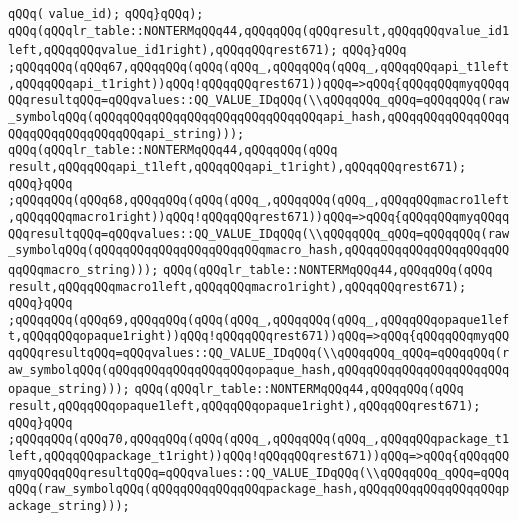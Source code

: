\verb|qQQq(|\newline
\verb|value_id);|\newline
\verb|qQQq}qQQq);|\newline
\verb|qQQq(qQQqlr_table::NONTERMqQQq44,qQQqqQQq(qQQqresult,qQQqqQQqvalue_id1left,qQQqqQQqvalue_id1right),qQQqqQQqrest671);|\newline
\verb|qQQq}qQQq|\newline
\verb|;qQQqqQQq(qQQq67,qQQqqQQq(qQQq(qQQq_,qQQqqQQq(qQQq_,qQQqqQQqapi_t1left,qQQqqQQqapi_t1right))qQQq!qQQqqQQqrest671))qQQq=>qQQq{qQQqqQQqmyqQQqqQQqresultqQQq=qQQqvalues::QQ_VALUE_IDqQQq(\\qQQqqQQq_qQQq=qQQqqQQq(raw_symbolqQQq(qQQqqQQqqQQqqQQqqQQqqQQqqQQqqQQqapi_hash,qQQqqQQqqQQqqQQqqQQqqQQqqQQqqQQqqQQqapi_string)));|\newline
\verb|qQQq(qQQqlr_table::NONTERMqQQq44,qQQqqQQq(qQQq|\newline
\verb|result,qQQqqQQqapi_t1left,qQQqqQQqapi_t1right),qQQqqQQqrest671);|\newline
\verb|qQQq}qQQq|\newline
\verb|;qQQqqQQq(qQQq68,qQQqqQQq(qQQq(qQQq_,qQQqqQQq(qQQq_,qQQqqQQqmacro1left,qQQqqQQqmacro1right))qQQq!qQQqqQQqrest671))qQQq=>qQQq{qQQqqQQqmyqQQqqQQqresultqQQq=qQQqvalues::QQ_VALUE_IDqQQq(\\qQQqqQQq_qQQq=qQQqqQQq(raw_symbolqQQq(qQQqqQQqqQQqqQQqqQQqqQQqmacro_hash,qQQqqQQqqQQqqQQqqQQqqQQqqQQqmacro_string)));|\newline
\verb|qQQq(qQQqlr_table::NONTERMqQQq44,qQQqqQQq(qQQq|\newline
\verb|result,qQQqqQQqmacro1left,qQQqqQQqmacro1right),qQQqqQQqrest671);|\newline
\verb|qQQq}qQQq|\newline
\verb|;qQQqqQQq(qQQq69,qQQqqQQq(qQQq(qQQq_,qQQqqQQq(qQQq_,qQQqqQQqopaque1left,qQQqqQQqopaque1right))qQQq!qQQqqQQqrest671))qQQq=>qQQq{qQQqqQQqmyqQQqqQQqresultqQQq=qQQqvalues::QQ_VALUE_IDqQQq(\\qQQqqQQq_qQQq=qQQqqQQq(raw_symbolqQQq(qQQqqQQqqQQqqQQqqQQqopaque_hash,qQQqqQQqqQQqqQQqqQQqqQQqopaque_string)));|\newline
\verb|qQQq(qQQqlr_table::NONTERMqQQq44,qQQqqQQq(qQQq|\newline
\verb|result,qQQqqQQqopaque1left,qQQqqQQqopaque1right),qQQqqQQqrest671);|\newline
\verb|qQQq}qQQq|\newline
\verb|;qQQqqQQq(qQQq70,qQQqqQQq(qQQq(qQQq_,qQQqqQQq(qQQq_,qQQqqQQqpackage_t1left,qQQqqQQqpackage_t1right))qQQq!qQQqqQQqrest671))qQQq=>qQQq{qQQqqQQqmyqQQqqQQqresultqQQq=qQQqvalues::QQ_VALUE_IDqQQq(\\qQQqqQQq_qQQq=qQQqqQQq(raw_symbolqQQq(qQQqqQQqqQQqqQQqpackage_hash,qQQqqQQqqQQqqQQqqQQqpackage_string)));|\newline
